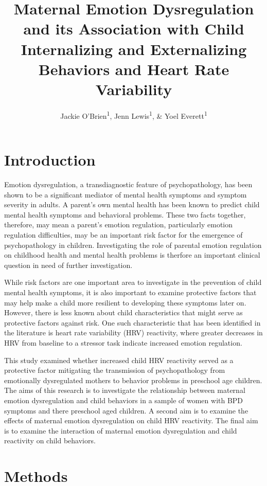 \documentclass[man]{apa6}
\title{Maternal Emotion Dysregulation and its Association with Child
Internalizing and Externalizing Behaviors and Heart Rate Variability}
\author{Jackie O'Brien\textsuperscript{1}, Jenn Lewis\textsuperscript{1}, \&
Yoel Everett\textsuperscript{1}}
\date{}
\affiliation{
\vspace{0.5cm}
\textsuperscript{1} University of Oregon}
\begin{document}
\maketitle

\section{Introduction}\label{introduction}

Emotion dysregulation, a transdiagnostic feature of psychopathology, has
been shown to be a significant mediator of mental health symptoms and
symptom severity in adults. A parent's own mental health has been known
to predict child mental health symptoms and behavioral problems. These
two facts together, therefore, may mean a parent's emotion regulation,
particularly emotion regulation difficulties, may be an important risk
factor for the emergence of psychopathology in children. Investigating
the role of parental emotion regulation on childhood health and mental
health problems is therfore an important clinical question in need of
further investigation.

While risk factors are one important area to investigate in the
prevention of child mental health symptoms, it is also important to
examine protective factors that may help make a child more resilient to
developing these symptoms later on. However, there is less known about
child characteristics that might serve as protective factors against
risk. One such characteristic that has been identified in the literature
is heart rate variability (HRV) reactivity, where greater decreases in
HRV from baseline to a stressor task indicate increased emotion
regulation.

This study examined whether increased child HRV reactivity served as a
protective factor mitigating the transmission of psychopathology from
emotionally dysregulated mothers to behavior problems in preschool age
children. The aims of this research is to investigate the relationship
between maternal emotion dysregulation and child behaviors in a sample
of women with BPD symptoms and there preschool aged children. A second
aim is to examine the effects of maternal emotion dysregulation on child
HRV reactivity. The final aim is to examine the interaction of maternal
emotion dysregulation and child reactivity on child behaviors.

\section{Methods}\label{methods}
\end{document}
